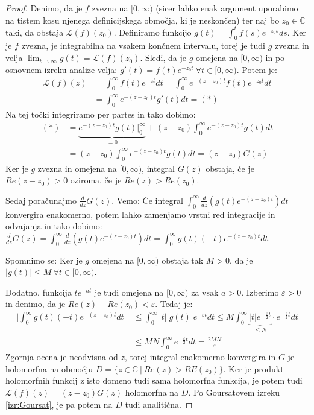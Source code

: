 \documentclass[a4paper, 10pt]{article}
\newcommand{\abs}[1]{\ensuremath{\lvert #1 \rvert}}
\newcommand{\mth}[1]{\ensuremath{\mathbb{#1}}}
\newcommand{\C}{\mth{C}}
\begin{document}
			\begin{proof}
				Denimo, da je $f$ zvezna na $[0, \infty)$ (sicer lahko enak argument uporabimo na tistem kosu njenega definicijskega območja, ki je neskončen) ter naj bo $z_0\in\C$ taki, da obstaja $\mathcal{L}(f)(z_0)$. Definiramo funkcijo $g(t) = \int_{0}^{t}f(s)e^{-z_0s}ds$. Ker je $f$ zvezna, je integrabilna na vsakem končnem intervalu, torej je tudi $g$ zvezna in velja $\lim_{t\to\infty}g(t) = \mathcal{L}(f)(z_0)$. Sledi, da je $g$ omejena na $[0,\infty)$ in po osnovnem izreku analize velja: $g'(t)=f(t)e^{-z_0t}~\forall t\in [0,\infty)$. Potem je: \begin{align*}
					\mathcal{L}(f)(z) &= \int_{0}^{\infty}f(t)e^{-zt}dt = \int_{0}^{\infty}e^{-(z-z_0)t}\underline{f(t)e^{-z_0t}}dt \\
					&= \int_{0}^{\infty}e^{-(z-z_0)t}g'(t)dt = (*)
				\end{align*}
				Na tej točki integriramo per partes in tako dobimo:
				\begin{align*}
					(*) &= \underbrace{e^{-(z-z_0)t}g(t)\big|_{0}^{\infty}}_{=0} + (z-z_0)\int_{0}^{\infty}e^{-(z-z_0)t}g(t)dt \\
					&=(z-z_0)\int_{0}^{\infty}e^{-(z-z_0)t}g(t)dt = (z-z_0)G(z)
				\end{align*}
				Ker je $g$ zvezna in omejena na $[0, \infty)$, integral $G(z)$ obstaja, če je $Re(z-z_0) > 0$ oziroma, če je $Re(z) > Re(z_0)$.
				
				Sedaj poračunajmo $\frac{d}{dz}G(z)$. Vemo: Če integral $\int_{0}^{\infty}\frac{d}{dz}(g(t)e^{-(z-z_0)t})dt$ konvergira enakomerno, potem lahko zamenjamo vrstni red integracije in odvajanja in tako dobimo: $\frac{d}{dz}G(z) =\int_{0}^{\infty}\frac{d}{dz}(g(t)e^{-(z-z_0)t})dt= \int_{0}^{\infty}g(t)(-t)e^{-(z-z_0)t}dt$.
				
				Spomnimo se: Ker je $g$ omejena na $[0, \infty)$ obstaja tak $M> 0$, da je $\abs{g(t)} \leq M~\forall t\in [0, \infty)$. 
				
				Dodatno, funkcija $te^{-at}$ je tudi omejena na $[0, \infty)$ za vsak $a>0$. Izberimo $\varepsilon>0$ in denimo, da je $Re(z)-Re(z_0)<\varepsilon$. Tedaj je: \begin{align*}
					\abs{\int_{0}^{\infty}g(t)(-t)e^{-(z-z_0)t}dt} &\leq \int_{0}^{\infty}\abs{t}\abs{g(t)}e^{-\varepsilon t}dt \leq M\int_{0}^{\infty}\underbrace{\abs{t}e^{-\frac{\varepsilon}{2}t}}_{\leq N}\cdot e^{-\frac{\varepsilon}{2}t}dt \\
					&\leq MN \int_{0}^{\infty}e^{-\frac{\varepsilon}{2}t}dt = \frac{2MN}{\varepsilon}
				\end{align*}
				Zgornja ocena je neodvisna od $z$, torej integral enakomerno konvergira in $G$ je holomorfna na območju $D=\{z\in\C~|~Re(z)>RE(z_0)\}$. Ker je produkt holomorfnih funkcij z isto domeno tudi sama holomorfna funkcija, je potem tudi $\mathcal{L}(f)(z) = (z-z_0)G(z)$ holomorfna na $D$. Po Goursatovem izreku \ref{izr:Goursat}, je pa potem na $D$ tudi analitična.
			\end{proof}
			
\end{document}
